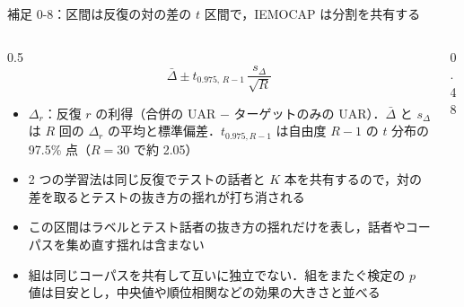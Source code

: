 \begin{frame}{補足 0-8：区間は反復の対の差の $t$ 区間で，IEMOCAP は分割を共有する}
  \label{s:set:stat}
  \vspace{-0.2em}
  \begin{columns}[T,onlytextwidth]
    \begin{column}{0.5\textwidth}
      {\tighteq\small
      \[
        \bar{\Delta} \pm t_{0.975,\,R-1}\,\frac{s_\Delta}{\sqrt{R}}
      \]}
      \begin{itemize}\scriptsize\setlength{\itemsep}{3pt}
        \item $\Delta_r$：反復 $r$ の利得（合併の UAR − ターゲットのみの UAR）．$\bar{\Delta}$ と $s_\Delta$ は $R$ 回の $\Delta_r$ の平均と標準偏差．$t_{0.975,R-1}$ は自由度 $R-1$ の $t$ 分布の 97.5\% 点（$R=30$ で約 2.05）
        \item 2 つの学習法は同じ反復でテストの話者と $K$ 本を共有するので，対の差を取るとテストの抜き方の揺れが打ち消される
        \item この区間はラベルとテスト話者の抜き方の揺れだけを表し，話者やコーパスを集め直す揺れは含まない
        \item 組は同じコーパスを共有して互いに独立でない．組をまたぐ検定の $p$ 値は目安とし，中央値や順位相関などの効果の大きさと並べる
      \end{itemize}
    \end{column}
    \begin{column}{0.48\textwidth}
      \centering
      \par
      \vspace{0.2em}
      \begin{itemize}\scriptsize\setlength{\itemsep}{3pt}

\end{itemize}
\end{column}
\end{columns}
\end{frame}
